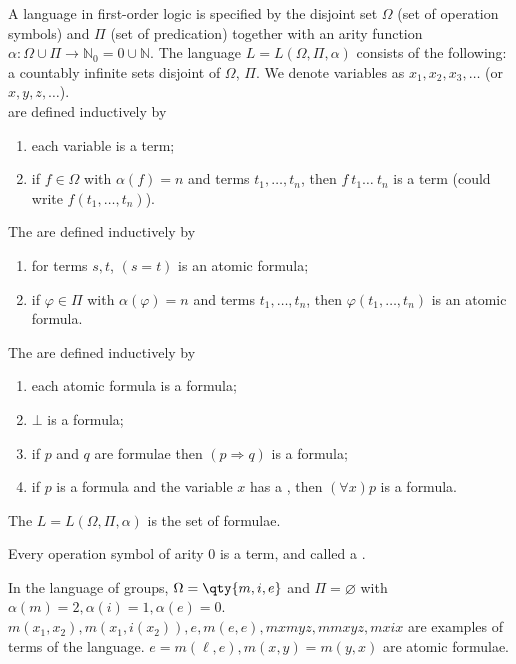 A language in first-order logic is specified by the disjoint set $\Omega$ (set of operation symbols) and $\Pi$ (set of predication) together with an arity function $\alpha \colon \Omega \cup \Pi \to \mathbb N_0 = \qty{0} \cup \mathbb{N}$.
The language $L = L(\Omega, \Pi, \alpha)$ consists of the following:
 a countably infinite sets disjoint of $\Omega$, $\Pi$.
We denote variables as $x_1, x_2, x_3, \dots$ (or $x, y, z, \dots$). \\
 are defined inductively by
\begin{enumerate}
    \item each variable is a term;
    \item if $f \in \Omega$ with $\alpha(f) = n$ and terms $t_1, \dots, t_n$, then $f\ t_1\dots\ t_n$ is a term (could write $f(t_1, \dots, t_n)$).
\end{enumerate}
The  are defined inductively by
\begin{enumerate}
    \item for terms $s, t$, $(s = t)$ is an atomic formula;
    \item if $\varphi \in \Pi$ with $\alpha(\varphi) = n$ and terms $t_1, \dots, t_n$, then $\varphi(t_1, \dots, t_n)$ is an atomic formula.
\end{enumerate}
The  are defined inductively by
\begin{enumerate}
    \item each atomic formula is a formula;
    \item $\bot$ is a formula;
    \item if $p$ and $q$ are formulae then $(p \Rightarrow q)$ is a formula;
    \item if $p$ is a formula and the variable $x$ has a , then $(\forall x) p$ is a formula.
\end{enumerate}

The  $L = L(\Omega, \Pi, \alpha)$ is the set of formulae.

\begin{definition}[Constant]
    Every operation symbol of arity $0$ is a term, and called a .
\end{definition}

\begin{example}
    In the language of groups, $\Omega = \qty{m, i, e}$ and $\Pi = \varnothing$ with $\alpha(m) = 2, \alpha(i) = 1, \alpha(e) = 0$.
    $m(x_1, x_2), m(x_1, i(x_2)), e, m(e, e), mxmyz, mmxyz, mxix$ are examples of terms of the language.
    $e = m(\ell, e), m(x,y) = m(y,x)$ are atomic formulae.
\end{example}

